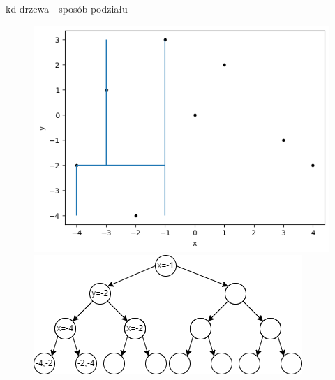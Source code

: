 \documentclass[aspectratio=169,dvipsnames]{beamer}
\begin{document}
\begin{frame}{kd-drzewa - sposób podziału}
    \begin{figure}[H]
        \centering
          \begin{minipage}{0.5\textwidth}
            \centering
            \includegraphics[width=\linewidth]{images/plots/5.png}
          \end{minipage}%
          \begin{minipage}{0.5\textwidth}
            \centering
            \includegraphics[width=\linewidth]{images/trees/6.drawio.png}
          \end{minipage}
    \end{figure}
\end{frame}
\end{document}
